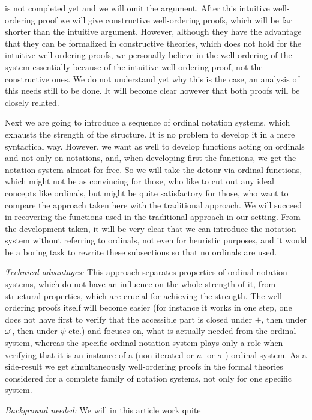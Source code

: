 \documentclass[10pt]{article}
\begin{document}
is not completed yet and we will omit the argument.
After this intuitive well-ordering proof we will give constructive
well-ordering proofs, which will be far shorter than the
intuitive argument. However, although they
have the advantage that they can be formalized in constructive theories, which
does not hold for the intuitive well-ordering proofs, we personally believe
in the well-ordering of the system essentially because of the intuitive 
well-ordering proof, not the constructive ones.
We do not understand
yet why this is the case, an analysis  of this needs still to be 
done.
It will become clear however that  both proofs
will be closely related.\par 
Next we are going to introduce a sequence of  ordinal notation systems, which
exhausts the strength of the structure. It is no problem to 
develop it in a mere syntactical way. However, we want as well to
develop functions acting on ordinals and not only on notations, and,
when developing first the functions, we get the notation system
almost for free. So we will take the detour via ordinal functions, which
might not be as convincing for those, who like to cut out any ideal concepts
like ordinals, but might be quite satisfactory for those, who want to
compare the approach taken here with the traditional approach.
We will succeed in recovering the functions used in the traditional approach
in our setting. From the development taken, it will be very clear 
that we can introduce the notation system without
referring to ordinals, not even for heuristic purposes, and it would be
a boring task to rewrite these subsections so that no ordinals are used.\par 
{\em Technical advantages:} This approach separates 
properties of ordinal notation systems, which do not have an influence
on the whole strength of it,
from structural properties, which are crucial for achieving the strength.
The well-ordering proofs itself will become easier
(for instance it works in one step, one does not have  first to
verify that the accessible part is closed under $+$, then under $\omega^\cdot$,
then under $\psi$ etc.) and focuses on, what is actually
needed from the ordinal system,
whereas the specific ordinal notation system plays only
a role when verifying that it is an instance of a 
(non-iterated or $n$- or $\sigma$-) ordinal system.
As a side-result we get simultaneously well-ordering proofs in the 
formal theories considered for a complete 
family of notation systems, not only for one specific system.\par  
{\em Background needed:} We will in this article work quite 
\end{document}
